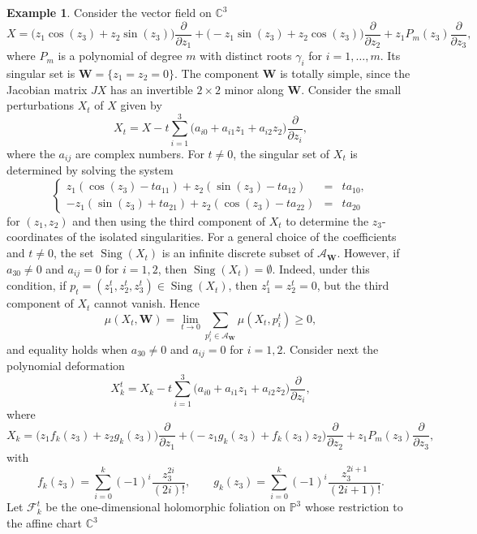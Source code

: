 \documentclass[10pt,twoside]{amsart}
\numberwithin{equation}{section}
\theoremstyle{definition}
\newtheorem{example}[proposition]{Example}
\theoremstyle{remark}
\DeclareMathOperator{\sing}{Sing}
\newcommand{\C}{\mathbb{C}}
\newcommand{\fol}{\mathcal{F}}
\newcommand{\W}{\mathbf{W}}
\begin{document}
\begin{example}
Consider the vector field on $\C^3$
\begin{equation}
X= \big( z_1\cos(z_3) + z_2\sin(z_3)\big)\frac{\partial}{\partial z_1}
+ \big( -z_1\sin(z_3) + z_2\cos( z_3)\big)\frac{\partial}{\partial z_2}
+ z_1P_m(z_3)\frac{\partial}{\partial z_3},
\end{equation}
where $P_m$ is a polynomial of degree $m$ with distinct roots $\gamma_i$ for $i=1,\ldots,m$.
Its singular set is $\W=\{z_1=z_2=0\}$. The component $\W$ is totally simple, since the Jacobian matrix $JX$ has an invertible $2\times2$ minor along $\W$.
Consider the small perturbations $X_t$ of $X$ given by
\begin{equation}
X_t = X-t\sum_{i=1}^{3}\big( a_{i0}+a_{i1}z_1+a_{i2}z_2\big)\frac{\partial}{\partial z_i},
\end{equation}
where the $a_{ij}$ are complex numbers. For $t\ne 0$, the singular set of $X_t$ is determined by solving the system
\begin{equation}\label{system1}
\left\{
\begin{array}{lcl}
z_1(\cos(z_3)-ta_{11})+z_2(\sin(z_3)-ta_{12})&=&ta_{10},\\
-z_1(\sin(z_3)+ta_{21})+z_2(\cos(z_3)-ta_{22})&=&ta_{20}
\end{array}
\right.
\end{equation}
for $(z_1,z_2)$ and then using the third component of $X_t$ to determine the $z_3$-coordinates of the isolated singularities.
For a general choice of the coefficients and $t\neq0$, the set $\sing(X_t)$ is an infinite discrete subset of $\mathcal A_{\W}$.
However, if $a_{30}\ne0$ and $a_{ij}=0$ for $i=1,2$, then $\sing(X_t)=\emptyset$.
Indeed, under this condition, if $p_t=(z_1^t,z_2^t,z_3^t)\in \sing(X_t)$, then $z_1^t=z_2^t=0$,
but the third component of $X_t$ cannot vanish. Hence
\[
\mu(X_t,\W) = \lim_{t\to0}\sum_{p_i^t\in\mathcal{A}_{\W}}\mu(X_t,p_i^t) \geq 0,
\]
and equality holds when $a_{30}\neq0$ and $a_{ij}=0$ for $i=1,2$. Consider next the polynomial deformation
\[
X_k^t = X_k - t\sum_{i=1}^{3}\big( a_{i0}+a_{i1}z_1+a_{i2}z_2\big)\frac{\partial}{\partial z_i},
\]
where
\[
X_k = \big( z_1f_{k}(z_3)+z_2g_k(z_3)\big)\frac{\partial}{\partial z_1}
+\big(-z_1 g_k(z_3)+f_k(z_3) z_2\big)\frac{\partial}{\partial z_2}
+z_1P_m(z_3)\frac{\partial}{\partial z_3},
\]
with
\[
f_k(z_3)=\sum_{i=0}^{k}(-1)^i\frac{z_3^{2i}}{(2i)!},
\qquad
g_k(z_3)=\sum_{i=0}^{k}(-1)^i\frac{z_3^{2i+1}}{(2i+1)!}.
\]
Let $\fol_k^t$ be the one-dimensional holomorphic foliation on $\mathbb{P}^3$ whose restriction to the affine chart $\C^3$

\end{example}
\end{document}
